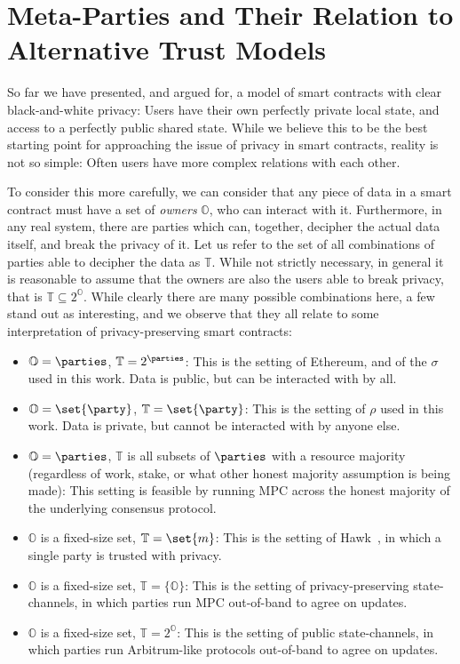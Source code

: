\section{Meta-Parties and Their Relation to Alternative Trust Models}
\label{sec:metaparties}

So far we have presented, and argued for, a model of smart contracts with clear
black-and-white privacy: Users have their own perfectly private local state, and
access to a perfectly public shared state. While we believe this to be the best
starting point for approaching the issue of privacy in smart contracts, reality
is not so simple: Often users have more complex relations with each other.

To consider this more carefully, we can consider that any piece of data in a
smart contract must have a set of \emph{owners} $\mathbb{O}$, who can interact
with it. Furthermore, in any real system, there are parties which can, together,
decipher the actual data itself, and break the privacy of it. Let us refer to
the set of all combinations of parties able to decipher the data as
$\mathbb{T}$. While not strictly necessary, in general it is reasonable to
assume that the owners are also the users able to break privacy, that is
$\mathbb{T} \subseteq 2^{\mathbb{O}}$. While clearly there are many possible
combinations here, a few stand out as interesting, and we observe that they all
relate to some interpretation of privacy-preserving smart contracts:

\begin{itemize}
  \item $\mathbb{O} = \parties$, $\mathbb{T} = 2^\parties$: This is the
    setting of Ethereum, and of the $\sigma$ used in this work. Data is public,
    but can be interacted with by all.
  \item $\mathbb{O} = \set{\party}$, $\mathbb{T} = \set{\party}$: This is the
    setting of $\rho$ used in this work. Data is private, but cannot be
    interacted with by anyone else.
  \item $\mathbb{O} = \parties$, $\mathbb{T}$ is all subsets of $\parties$ with
    a resource majority (regardless of work, stake, or what other honest
    majority assumption is being made): This setting is feasible by running MPC
    across the honest majority of the underlying consensus protocol.
  \item $\mathbb{O}$ is a fixed-size set, $\mathbb{T} = \set{m}$: This is the
    setting of Hawk~\cite{SP:KMSWP16}, in which a single party is trusted with privacy.
  \item $\mathbb{O}$ is a fixed-size set, $\mathbb{T} = \{\mathbb{O}\}$: This is
    the setting of privacy-preserving state-channels, in which parties run MPC
    out-of-band to agree on updates.
  \item $\mathbb{O}$ is a fixed-size set, $\mathbb{T} = 2^{\mathbb{O}}$: This is
    the setting of public state-channels, in which parties run Arbitrum-like
    protocols out-of-band to agree on updates.
\end{itemize}

